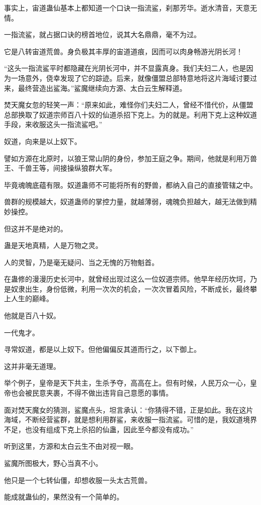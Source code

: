 \begin{this_body}
事实上，宙道蛊仙基本上都知道一个口诀一指流鲨，刹那芳华。逝水清音，天意无情。

一指流鲨，就占据口诀的榜首地位，说其大名鼎鼎，毫不为过。

它是八转宙道荒兽。身负极其丰厚的宙道道痕，因而可以肉身畅游光阴长河！

“这头一指流鲨平时都隐藏在光阴长河中，并不显露真身。我们夫妇二人，也是因为一场意外，侥幸发现了它的踪迹。后来，就像僵盟总部特意地将这片海域讨要过来，最终营造出鲨海。”鲨魔继续向方源、太白云生解释道。

焚天魔女忽的轻笑一声：“原来如此，难怪你们夫妇二人，曾经不惜代价，从僵盟总部换取了奴道宗师百八十奴的仙道杀招下克上。为的就是。利用下克上这种奴道手段，来收服这头一指流鲨吧。”

奴道，向来是以上奴下。

譬如方源在北原时，以狼王常山阴的身份，参加王庭之争。期间，他就是利用万兽王、千兽王等，间接操纵狼群大军。

毕竟魂魄底蕴有限。奴道蛊师不可能将所有的野兽，都纳入自己的直接管辖之中。

兽群的规模越大，奴道蛊师的掌控力量，就越薄弱，魂魄负担越大，越无法做到精妙操控。

但这并不是绝对的。

蛊是天地真精，人是万物之灵。

人的灵智，乃是毫无疑问、当之无愧的万物魁首。

在蛊修的漫漫历史长河中，就曾经出现过这么一位奴道宗师。他早年经历坎坷，乃是奴隶出生，身份低微，利用一次次的机会，一次次冒着风险，不断成长，最终攀上人生的巅峰。

他就是百八十奴。

一代鬼才。

寻常奴道，都是以上奴下。但他偏偏反其道而行之，以下御上。

这并非毫无道理。

举个例子，皇帝是天下共主，生杀予夺，高高在上。但有时候，人民万众一心，皇帝也会被民意夹裹，不得不做出违背自己意愿的事情。

面对焚天魔女的猜测，鲨魔点头，坦言承认：“你猜得不错，正是如此。我在这片海域，不断经营鲨群，就是想利用群鲨，来收服一指流鲨。可惜的是，我奴道境界不足，也没有组成下克上杀招的仙蛊，因此至今都没有成功。”

听到这里，方源和太白云生不由对视一眼。

鲨魔所图极大，野心当真不小。

他只是一个七转仙僵，却想收服一头太古荒兽。

能成就蛊仙的，果然没有一个简单的。


\end{this_body}
